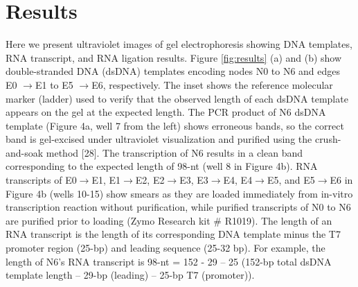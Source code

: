 \section{Results} \label{sec:results}
			Here we present ultraviolet images of gel electrophoresis showing DNA templates, RNA transcript, and RNA ligation results. 
			Figure \ref{fig:results}  (a) and (b) show double-stranded DNA (dsDNA) templates encoding nodes N0 to N6 and 
			edges E0 $\rightarrow$E1 to E5 $\rightarrow$E6, respectively.  The inset shows the reference molecular marker (ladder) 
			used to verify that the observed length of each dsDNA template appears on the gel at the expected length. The PCR product of 
			N6 dsDNA template (Figure 4a, well 7 from the left) shows erroneous bands, so the correct band is gel-excised under ultraviolet 
			visualization and purified using the crush-and-soak method [28]. The transcription of N6 results in a clean band corresponding 
			to the expected length of 98-nt (well 8 in Figure 4b). RNA transcripts of E0$\rightarrow$E1, E1$\rightarrow$E2, E2$\rightarrow$E3, 
			E3$\rightarrow$E4, E4$\rightarrow$E5, and E5$\rightarrow$E6 in Figure 4b (wells 10-15) show smears as they are loaded immediately 
			from in-vitro transcription reaction without purification, while purified transcripts of N0 to N6  are purified prior to loading 
			(Zymo Research kit \# R1019). The length of an RNA transcript is the length of its corresponding DNA template minus the T7 
			promoter region (25-bp) and leading sequence (25-32 bp). For example, the length of N6’s RNA transcript 
			is 98-nt = 152 - 29 – 25 (152-bp total dsDNA template length – 29-bp (leading) –  25-bp T7 (promoter)).
